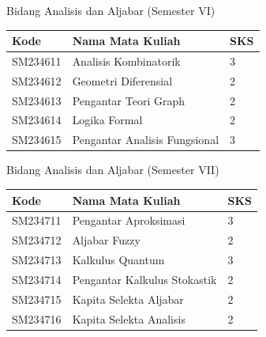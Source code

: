 \documentclass[aspectratio=169]{beamer} %
\begin{document}
\begin{frame}{Bidang Analisis dan Aljabar (Semester VI)}

\begin{table}
	\renewcommand{\arraystretch}{1.3}
	\setlength{\tabcolsep}{10pt}
	\begin{tabular}{l l l}
		\toprule
		\textbf{Kode} & \textbf{Nama Mata Kuliah} & \textbf{SKS} \\
		\midrule
		SM234611 & Analisis Kombinatorik & 3 \\
		SM234612 & Geometri Diferensial & 2 \\
		SM234613 & Pengantar Teori Graph & 2 \\
		SM234614 & Logika Formal & 2 \\
		SM234615 & Pengantar Analisis Fungsional & 3 \\
		\bottomrule
	\end{tabular}
\end{table}

\end{frame}

\begin{frame}{Bidang Analisis dan Aljabar (Semester VII)}

\begin{table}
	\renewcommand{\arraystretch}{1.3}
	\setlength{\tabcolsep}{10pt}
	\begin{tabular}{l l l}
		\toprule
		\textbf{Kode} & \textbf{Nama Mata Kuliah} & \textbf{SKS} \\
		\midrule
		SM234711 & Pengantar Aproksimasi & 3 \\
		SM234712 & Aljabar Fuzzy & 2 \\
		SM234713 & Kalkulus Quantum & 3 \\
		SM234714 & Pengantar Kalkulus Stokastik & 2 \\
		SM234715 & Kapita Selekta Aljabar & 2 \\
		SM234716 & Kapita Selekta Analisis & 2 \\
		\bottomrule
	\end{tabular}
\end{table}

\end{frame}

\end{document}
